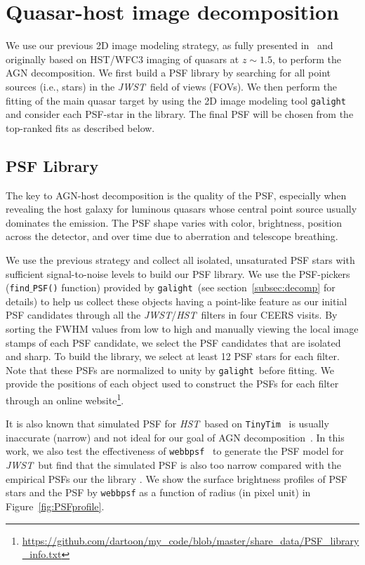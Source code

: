 \documentclass[twocolumn,]{aastex631}
\newcommand{\galight}{\texttt{galight}}
\newcommand{\hst}{{\it HST}}
\newcommand{\jwst}{{\it JWST}}
\begin{document}
\section{Quasar-host image decomposition} \label{sec:decomp}
We use our previous 2D image modeling strategy, as fully presented in~\citet{Ding2020} and originally based on HST/WFC3 imaging of quasars at $z\sim1.5$, to perform the AGN decomposition. We first build a PSF library by searching for all point sources (i.e., stars) in the \jwst\ field of views (FOVs). We then perform the fitting of the main quasar target by using the 2D image modeling tool \galight~\citep{Ding2020, Ding2021a} and consider each PSF-star in the library. The final PSF will be chosen from the top-ranked fits as described below.

\subsection{PSF Library}\label{sec:psfLibrary}
The key to AGN-host decomposition is the quality of the PSF, especially when revealing the host galaxy for luminous quasars whose central point source usually dominates the emission. The PSF shape varies with color, brightness, position across the detector, and over time due to aberration and telescope breathing.

We use the previous strategy %
and collect all isolated, unsaturated PSF stars with sufficient signal-to-noise levels to build our PSF library. We use the PSF-pickers (\texttt{find$\_$PSF()} function) provided by \galight\ (see section~\ref{subsec:decomp} for details) to help us collect these objects having a point-like feature as our initial PSF candidates through all the \jwst/\hst\ filters in four CEERS visits. By sorting the FWHM values from low to high and manually viewing the local image stamps of each PSF candidate, we select the PSF candidates that are isolated and sharp. To build the library, we select at least 12 PSF stars for each filter.  Note that these PSFs are normalized to unity by \galight\ before fitting. We provide the positions of each object used to construct the PSFs for each filter through an online website\footnote{\url{https://github.com/dartoon/my_code/blob/master/share_data/PSF_library_info.txt}}.

It is also known that simulated PSF for \hst\ based on \texttt{TinyTim}~\citep{2011SPIE.8127E..0JK} is usually inaccurate (narrow) and not ideal for our goal of AGN decomposition~\citep[e.g.,][]{Mechtley2012}. In this work, we also test the effectiveness of \texttt{webbpsf}~\citep{2014SPIE.9143E..3XP} to generate the PSF model for \jwst\ but find that the simulated PSF is also too narrow compared with the empirical PSFs our the library \citep[see][for similar conclusions]{Ono2022}. We show the surface brightness profiles of PSF stars and the PSF by \texttt{webbpsf} as a function of radius (in pixel unit) in Figure~\ref{fig:PSFprofile}. 
\end{document}
